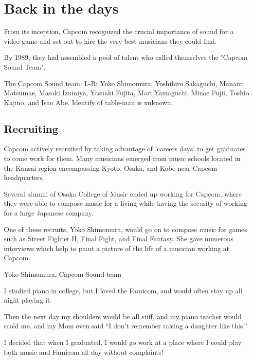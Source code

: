 \section{Back in the days}
From its inception, Capcom recognized the crucial importance of sound for a video-game and set out to hire the very best musicians they could find.

By 1989, they had assembled a pool of talent who called themselves the "Capcom Sound Team".


The Capcom Sound team. L-R: Yoko Shimomura, Yoshihiro Sakaguchi, Manami Matsumae, Masaki Izumiya, Yasuaki Fujita, Mari Yamaguchi, Minae Fujii, Toshio Kajino, and Isao Abe. Identify of table-man is unknown.

\subsection{Recruiting}
Capcom actively recruited by taking advantage of 'careers days' to get graduates to come work for them. Many musicians emerged from music schools located in the Kansai region encompassing Kyoto, Osaka, and Kobe near Capcom headquarters. 

Several alumni of Osaka College of Music ended up working for Capcom, where they were able to compose music for a living while having the security of working for a large Japanese company. 





One of these recruits, Yoko Shimomura, would go on to compose music for games such as Street Fighter II, Final Fight, and Final Fantasy. She gave numerous interviews which help to paint a picture of the life of a musician working at Capcom.


\begin{q}{Yoko Shimomura, Capcom Sound team\cite{beep199010}}

I studied piano in college, but I loved the Famicom, and would often stay up all night playing it. 

Then the next day my shoulders would be all stiff, and my piano teacher would scold me, and my Mom even said “I don’t remember raising a daughter like this.”

I decided that when I graduated, I would go work at a place where I could play both music and Famicom all day without complaints!
\end{q}


